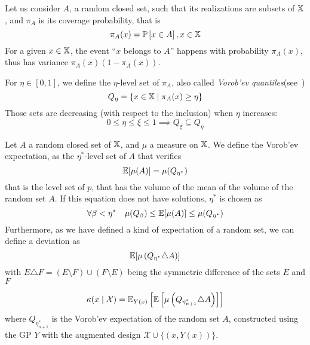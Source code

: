 \documentclass[../../Main_ManuscritThese.tex]{subfiles}
\begin{document}
Let us consider $A$, a random closed set, such that its realizations are subsets of $\mathbb{X}$, and $\pi_A$ is its coverage probability, that is
\begin{equation}
  \pi_A(x) = \mathbb{P}\left[x\in A\right], x\in\mathbb{X}
\end{equation}
For a given $x\in\mathbb{X}$, the event ``$x$ belongs to $A$'' happens with probability $\pi_A(x)$, thus has variance $\pi_A(x)(1 - \pi_A(x))$.

For $\eta \in [0, 1]$, we define the $\eta$-level set of $\pi_A$, also called \emph{Vorob'ev quantiles}(see~\cite{vorobyev_new_2003})
\begin{equation}
  Q_{\eta} = \{x\in\mathbb{X} \mid \pi_A(x) \geq \eta \}
\end{equation}
Those sets are decreasing (with respect to the inclusion) when $\eta$ increases:
\begin{equation}
  0\leq \eta \leq \xi \leq 1 \implies Q_{\xi} \subseteq Q_{\eta}
\end{equation}



\begin{definition}
  Let $A$ a random closed set of $\mathbb{X}$, and $\mu$ a measure on $\mathbb{X}$. We define the Vorob'ev expectation, as the $\eta^*$-level set of $A$ that verifies
  \begin{equation}
    \mathbb{E}[\mu(A)] = \mu(Q_{\eta^*})
  \end{equation}
  that is the level set of $p$, that has the volume of the mean of the volume of the random set $A$.
  If this equation does not have solutions, $\eta^*$ is chosen as
\begin{equation}
  \forall \beta < \eta^* \quad \mu(Q_{\beta}) \leq \mathbb{E}[\mu(A)] \leq \mu(Q_{\eta^*})
\end{equation}
Furthermore, as we have defined a kind of expectation of a random set, we can define a deviation as
\begin{equation}
  \mathbb{E}[\mu\left(Q_{\eta^*} \triangle A \right)]
\end{equation}
with $E\triangle F = \left(E \setminus F\right) \cup \left(F \setminus E\right)$ being the symmetric difference of the sets $E$ and $F$
\end{definition}

\begin{equation}
  \kappa(x \mid \mathcal{X}) = \mathbb{E}_{Y(x)}\left[\mathbb{E}\left[\mu\left(Q_{\eta^*_{n+1}}  \triangle A\right)\right]\right]
\end{equation}
where $Q_{\eta^*_{n+1}}$ is the Vorob'ev expectation of the random set $A$, constructed using the GP $Y$ with the augmented design $\mathcal{X}\cup\{(x, Y(x))\}$.
\end{document}
